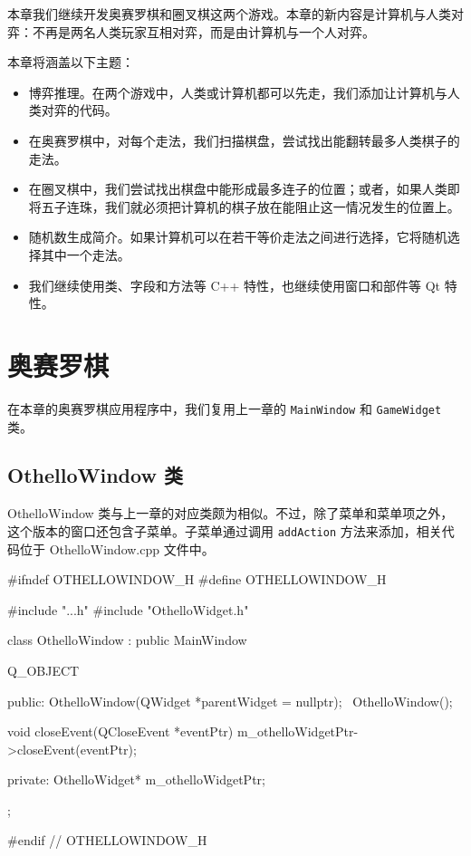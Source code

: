 \renewcommand{\codeInset}{63bp}
本章我们继续开发奥赛罗棋和圈叉棋这两个游戏。本章的新内容是计算机与人类对弈：不再是两名人类玩家互相对弈，而是由计算机与一个人对弈。

本章将涵盖以下主题：

\begin{itemize}
\item 博弈推理。在两个游戏中，人类或计算机都可以先走，我们添加让计算机与人类对弈的代码。
\item 在奥赛罗棋中，对每个走法，我们扫描棋盘，尝试找出能翻转最多人类棋子的走法。
\item 在圈叉棋中，我们尝试找出棋盘中能形成最多连子的位置；或者，如果人类即将五子连珠，我们就必须把计算机的棋子放在能阻止这一情况发生的位置上。
\item 随机数生成简介。如果计算机可以在若干等价走法之间进行选择，它将随机选择其中一个走法。
\item 我们继续使用类、字段和方法等 C++ 特性，也继续使用窗口和部件等 Qt 特性。
\end{itemize}

\section{奥赛罗棋}

在本章的奥赛罗棋应用程序中，我们复用上一章的 \texttt{MainWindow} 和 \texttt{GameWidget} 类。

\subsection{OthelloWindow 类}

OthelloWindow 类与上一章的对应类颇为相似。不过，除了菜单和菜单项之外，这个版本的窗口还包含子菜单。子菜单通过调用 \texttt{addAction} 方法来添加，相关代码位于 OthelloWindow.cpp 文件中。

\medskip{}

\begin{codebox}
#ifndef OTHELLOWINDOW_H
#define OTHELLOWINDOW_H

#include "..\MainWindow\MainWindow.h"
#include "OthelloWidget.h"

class OthelloWindow : public MainWindow {
  Q_OBJECT

  public:
    OthelloWindow(QWidget *parentWidget = nullptr);
    ~OthelloWindow();

    void closeEvent(QCloseEvent *eventPtr)
                   {m_othelloWidgetPtr->closeEvent(eventPtr);}

  private:
    OthelloWidget* m_othelloWidgetPtr;
};

#endif // OTHELLOWINDOW_H
\end{codebox}

